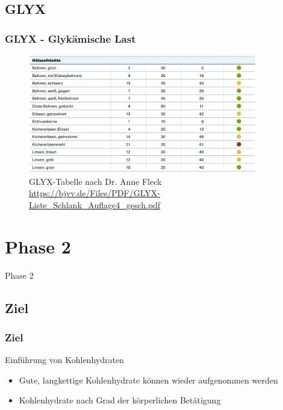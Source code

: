 \documentclass[xcolor=dvipsnames]{beamer}
\begin{document}
    \subsection{GLYX}
    \begin{frame}
        \frametitle{GLYX - Glykämische Last}
        \begin{figure}
            \includegraphics[width=10cm]{../images/glyx.png}
            \caption{GLYX-Tabelle nach Dr. Anne Fleck \url{https://bjvv.de/Files/PDF/GLYX-Liste_Schlank_Auflage4_gesch.pdf}}
        \end{figure}
    \end{frame}

    \section{Phase 2}
    {
        \begin{frame}
            \begin{center}
                \Huge Phase 2
            \end{center}
        \end{frame}
    }

    \subsection{Ziel}
    \begin{frame}
        \frametitle{Ziel}
        \begin{block}{Einführung von Kohlenhydraten}
            \begin{itemize}
                \setlength\itemsep{1em}
                \item Gute, langkettige Kohlenhydrate können wieder aufgenommen werden
                \item Kohlenhydrate nach Grad der körperlichen Betätigung
            \end{itemize}
        \end{block}

    \end{frame}
\end{document}
